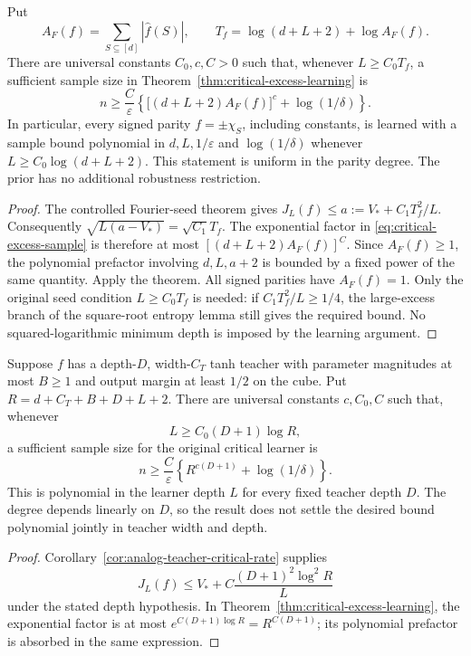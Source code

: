 \begin{corollary}
\label{cor:critical-fourier-learning}
Put
\[
 A_F(f)=\sum_{S\subseteq[d]}|\widehat f(S)|,\qquad
 T_f=\log(d+L+2)+\log A_F(f).
\]
There are universal constants $C_0,c,C>0$ such that, whenever
$L\ge C_0T_f$, a sufficient sample size in
Theorem~\ref{thm:critical-excess-learning} is
\[
 n\ge\frac{C}{\varepsilon}
 \left\{\bigl[(d+L+2)A_F(f)\bigr]^c+\log(1/\delta)\right\}.
\]
In particular, every signed parity $f=\pm\chi_S$, including constants,
is learned with a sample bound polynomial in $d,L,1/\varepsilon$ and
$\log(1/\delta)$ whenever $L\ge C_0\log(d+L+2)$.
This statement is uniform in the parity degree. The prior has no
additional robustness restriction.
\end{corollary}

\begin{proof}
The controlled Fourier-seed theorem gives
$J_L(f)\le a:=V_*+C_1T_f^2/L$. Consequently
$\sqrt{L(a-V_*)}=\sqrt{C_1}T_f$.
The exponential factor in \eqref{eq:critical-excess-sample} is therefore
at most $[(d+L+2)A_F(f)]^C$.
Since $A_F(f)\ge1$, the polynomial prefactor involving $d,L,a+2$
is bounded by a fixed power of the same quantity. Apply the theorem.
All signed parities have $A_F(f)=1$.
Only the original seed condition $L\ge C_0T_f$ is needed: if
$C_1T_f^2/L\ge1/4$, the large-excess branch of the square-root entropy
lemma still gives the required bound. No squared-logarithmic minimum
depth is imposed by the learning argument.
\end{proof}

\begin{corollary}
\label{cor:critical-analog-teacher-learning}
Suppose $f$ has a depth-$D$, width-$C_T$ tanh teacher with parameter
magnitudes at most $B\ge1$ and output margin at least $1/2$ on the
cube. Put $R=d+C_T+B+D+L+2$. There are universal constants $c,C_0,C$
such that, whenever
\[
 L\ge C_0(D+1)\log R,
\]
a sufficient sample size for the original critical learner is
\[
 n\ge\frac{C}{\varepsilon}
          \left\{R^{c(D+1)}+\log(1/\delta)\right\}.
\]
This is polynomial in the learner depth $L$ for every fixed teacher
depth $D$. The degree depends linearly on $D$, so the result does not
settle the desired bound polynomial jointly in teacher width and depth.
\end{corollary}

\begin{proof}
Corollary~\ref{cor:analog-teacher-critical-rate} supplies
\[
 J_L(f)\le V_*+C\frac{(D+1)^2\log^2R}{L}
\]
under the stated depth hypothesis. In
Theorem~\ref{thm:critical-excess-learning}, the exponential factor
is at most $e^{C(D+1)\log R}=R^{C(D+1)}$; its polynomial prefactor
is absorbed in the same expression.
\end{proof}

